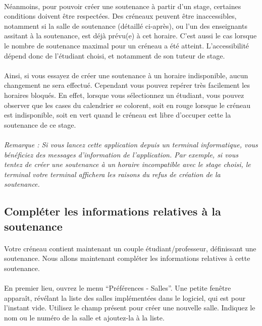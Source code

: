 \documentclass[a4paper,10pt]{book}
\begin{document}
	\paragraph{}
	  Néanmoins, pour pouvoir créer une soutenance à partir d'un stage, certaines conditions doivent être respectées.
	  Des créneaux peuvent être inaccessibles, notamment si la salle de soutenance (détaillé ci-après), ou l'un des enseignants assitant à la soutenance, est déjà prévu(e) à cet horaire.
	  C'est aussi le cas lorsque le nombre de soutenance maximal pour un créneau a été atteint.
	  L'accessibilité dépend donc de l'étudiant choisi, et notamment de son tuteur de stage.
	
	\paragraph{}
	  Ainsi, si vous essayez de créer une soutenance à un horaire indisponible, aucun changement ne sera effectué.
	  Cependant vous pouvez repérer très facilement les horaires bloqués.
	  En effet, lorsque vous sélectionnez un étudiant, vous pouvez observer que les cases du calendrier se colorent, soit en rouge lorsque le créneau est indisponible, soit en vert quand le créneau est libre d'occuper cette la soutenance de ce stage.
	  
	\paragraph{}
	  \textit{Remarque : Si vous lancez cette application depuis un terminal informatique, vous bénéficiez des messages d'information de l'application. Par exemple, si vous tentez de créer une soutenance à un horaire incompatible avec le stage choisi, le terminal votre terminal affichera les raisons du refus de création de la soutenance.}
	
	  
	  
	
      \subsection{Compléter les informations relatives à la soutenance}
	\paragraph{}
	  Votre créneau contient maintenant un couple étudiant/professeur, définissant une soutenance.
	  Nous allons maintenant compléter les informations relatives à cette soutenance.
	 
	\paragraph{}
	  En premier lieu, ouvrez le menu ``Préférences - Salles''. 
	  Une petite fenêtre apparaît, révélant la liste des salles implémentées dans le logiciel, qui est pour l'instant vide.
	  Utilisez le champ présent pour créer une nouvelle salle.
	  Indiquez le nom ou le numéro de la salle et ajoutez-la à la liste.
	  
\end{document}
